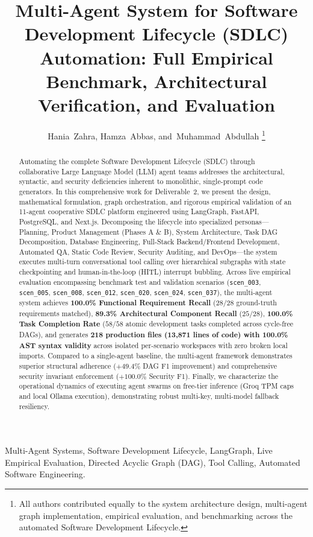 \documentclass[10pt,journal,compsoc]{IEEEtran}
\title{Multi-Agent System for Software Development Lifecycle (SDLC) Automation: Full Empirical Benchmark, Architectural Verification, and Evaluation}
\author{Hania~Zahra,
        Hamza~Abbas,
        and~Muhammad~Abdullah%
\thanks{All authors contributed equally to the system architecture design, multi-agent graph implementation, empirical evaluation, and benchmarking across the automated Software Development Lifecycle.}
}
\begin{document}
\maketitle

\begin{abstract}
Automating the complete Software Development Lifecycle (SDLC) through collaborative Large Language Model (LLM) agent teams addresses the architectural, syntactic, and security deficiencies inherent to monolithic, single-prompt code generators. In this comprehensive work for Deliverable~2, we present the design, mathematical formulation, graph orchestration, and rigorous empirical validation of an 11-agent cooperative SDLC platform engineered using LangGraph, FastAPI, PostgreSQL, and Next.js. Decomposing the lifecycle into specialized personas—Planning, Product Management (Phases A \& B), System Architecture, Task DAG Decomposition, Database Engineering, Full-Stack Backend/Frontend Development, Automated QA, Static Code Review, Security Auditing, and DevOps—the system executes multi-turn conversational tool calling over hierarchical subgraphs with state checkpointing and human-in-the-loop (HITL) interrupt bubbling. Across live empirical evaluation encompassing benchmark test and validation scenarios (\texttt{scen\_003}, \texttt{scen\_005}, \texttt{scen\_008}, \texttt{scen\_012}, \texttt{scen\_020}, \texttt{scen\_024}, \texttt{scen\_037}), the multi-agent system achieves \textbf{100.0\% Functional Requirement Recall} ($28/28$ ground-truth requirements matched), \textbf{89.3\% Architectural Component Recall} ($25/28$), \textbf{100.0\% Task Completion Rate} ($58/58$ atomic development tasks completed across cycle-free DAGs), and generates \textbf{218 production files (13,871 lines of code) with 100.0\% AST syntax validity} across isolated per-scenario workspaces with zero broken local imports. Compared to a single-agent baseline, the multi-agent framework demonstrates superior structural adherence ($+49.4\%$ DAG F1 improvement) and comprehensive security invariant enforcement ($+100.0\%$ Security F1). Finally, we characterize the operational dynamics of executing agent swarms on free-tier inference (Groq TPM caps and local Ollama execution), demonstrating robust multi-key, multi-model fallback resiliency.
\end{abstract}

\begin{IEEEkeywords}
Multi-Agent Systems, Software Development Lifecycle, LangGraph, Live Empirical Evaluation, Directed Acyclic Graph (DAG), Tool Calling, Automated Software Engineering.
\end{IEEEkeywords}
\end{document}
